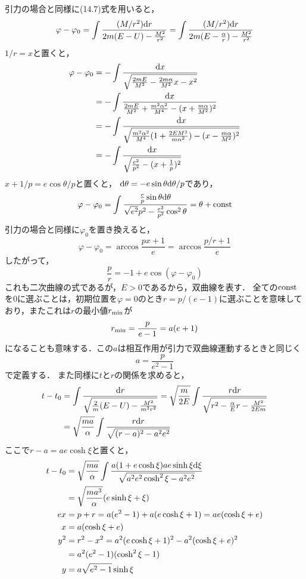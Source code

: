 \documentclass[12pt]{jsarticle}
\begin{document}
	引力の場合と同様に(14.7)式を用いると，
	\begin{align*}
	\varphi - \varphi_0
	= \int \frac{(M/r^2){\rm d}r}{2m(E-U)-\frac{M^2}{r^2}}
	= \int \frac{(M/r^2){\rm d}r}{2m(E-\frac{\alpha}{r})-\frac{M^2}{r^2}}
	\end{align*}
	$1/r=x$と置くと，
	\begin{align*}
	\varphi - \varphi_0
	&= -\int \frac{{\rm d}x}{\sqrt{\frac{2mE}{M^2}-\frac{2m\alpha}{M^2}x-x^2}} \\
	&= -\int \frac{{\rm d}x}
	{\frac{2mE}{M^2}+\frac{m^2 \alpha^2}{M^4}-(x+\frac{m\alpha}{M^2})^2} \\
	&= -\int
	\frac{{\rm d}x}{\sqrt{\frac{m^2\alpha^2}{M^4}(1+\frac{2EM^2}{m\alpha^2})
	-(x-\frac{m\alpha}{M^2})^2}} \\
	&= -\int \frac{{\rm d}x}{\sqrt{\frac{e^2}{p^2}-(x+\frac{1}{p})^2}}
	\end{align*}
	$x+1/p=e\cos{\theta}/p$と置くと，
	${\rm d}\theta = -e\sin{\theta}{\rm d}\theta/p$であり，
	\begin{align*}
	\varphi-\varphi_0
	= \int \frac{\frac{e}{p}\sin{\theta}{\rm d}\theta}
	{\sqrt{e^2}{p^2}-\frac{e^2}{p^2}\cos^2{\theta}}
	= \theta + {\rm const}
	\end{align*}
	引力の場合と同様に$\varphi_0$を置き換えると，
	\[
	\varphi - \varphi_0 = \arccos{\frac{px+1}{e}} = \arccos{\frac{p/r+1}{e}}
	\]
	したがって，
	\[
	\frac{p}{r} = -1 + e\cos{(\varphi - \varphi_0)}
	\]
	これも二次曲線の式であるが，$E>0$であるから，双曲線を表す．
	全ての${\rm const}$を$0$に選ぶことは，初期位置を$\varphi=0$のとき$r=p/(e-1)$に選ぶことを意味しており，またこれは$r$の最小値$r_{\rm min}$が
	\[
	r_{\rm min} = \frac{p}{e-1} = a(e+1)
	\]
	になることも意味する．この$a$は相互作用が引力で双曲線運動するときと同じく
	\[
	a = \frac{p}{e^2-1}
	\]
	で定義する．
	また同様に$t$と$r$の関係を求めると，
	\begin{align*}
	t-t_0 &= \int \frac{{\rm d}r}{\sqrt{\frac{2}{m}(E-U)-\frac{M^2}{m^2r^2}}}
	=\sqrt{\frac{m}{2E}}
	\int \frac{r {\rm d}r}{\sqrt{r^2-\frac{\alpha}{E}r-\frac{M^2}{2Em}}} \\
	&= \sqrt{\frac{ma}{\alpha}}
	\int \frac{r {\rm d}r}{\sqrt{(r-a)^2-a^2e^2}}
	\end{align*}
	ここで$r-a=ae\cosh{\xi}$と置くと，
	\begin{align*}
	t-t_0
	&= \sqrt{\frac{ma}{\alpha}} \int \frac{a(1+e\cosh{\xi})ae\sinh{\xi}{\rm d}\xi}
	{\sqrt{a^2e^2\cosh^2{\xi}-a^2e^2}} \\
	&= \sqrt{\frac{ma^3}{\alpha}}(e\sinh{\xi}+\xi) \\
	ex &= p+r = a(e^2-1)+a(e\cosh{\xi}+1) = ae(\cosh{\xi}+e) \\
	x &= a(\cosh{\xi}+e) \\
	y^2 &= r^2 - x^2 = a^2(e\cosh{\xi}+1)^2 - a^2(\cosh{\xi}+e)^2 \\
	&= a^2(e^2-1)(\cosh^2{\xi}-1) \\
	y &= a\sqrt{e^2-1}\sinh{\xi}
	\end{align*}
	
\end{document}
